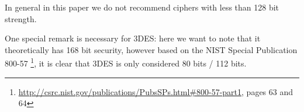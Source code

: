 



In general in this paper we do not recommend ciphers with less than 128 bit strength.

One special remark is necessary for 3DES: here we want to note
that it theoretically has 168 bit security, however based on the NIST Special
Publication 800-57
\footnote{\url{http://csrc.nist.gov/publications/PubsSPs.html\#800-57-part1},
pages 63 and 64}, it is clear that 3DES is only considered 80 bits / 112 bits.
